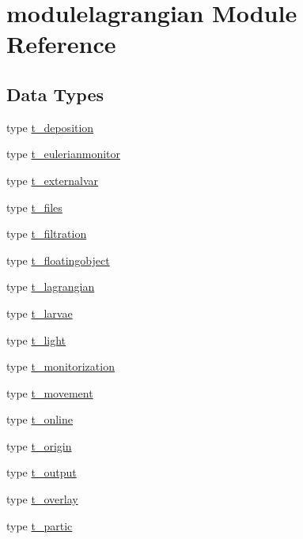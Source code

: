 \hypertarget{namespacemodulelagrangian}{}\section{modulelagrangian Module Reference}
\label{namespacemodulelagrangian}
\subsection*{Data Types}
\begin{DoxyCompactItemize}
\item 
type \mbox{\hyperlink{structmodulelagrangian_1_1t__deposition}{t\+\_\+deposition}}
\item 
type \mbox{\hyperlink{structmodulelagrangian_1_1t__eulerianmonitor}{t\+\_\+eulerianmonitor}}
\item 
type \mbox{\hyperlink{structmodulelagrangian_1_1t__externalvar}{t\+\_\+externalvar}}
\item 
type \mbox{\hyperlink{structmodulelagrangian_1_1t__files}{t\+\_\+files}}
\item 
type \mbox{\hyperlink{structmodulelagrangian_1_1t__filtration}{t\+\_\+filtration}}
\item 
type \mbox{\hyperlink{structmodulelagrangian_1_1t__floatingobject}{t\+\_\+floatingobject}}
\item 
type \mbox{\hyperlink{structmodulelagrangian_1_1t__lagrangian}{t\+\_\+lagrangian}}
\item 
type \mbox{\hyperlink{structmodulelagrangian_1_1t__larvae}{t\+\_\+larvae}}
\item 
type \mbox{\hyperlink{structmodulelagrangian_1_1t__light}{t\+\_\+light}}
\item 
type \mbox{\hyperlink{structmodulelagrangian_1_1t__monitorization}{t\+\_\+monitorization}}
\item 
type \mbox{\hyperlink{structmodulelagrangian_1_1t__movement}{t\+\_\+movement}}
\item 
type \mbox{\hyperlink{structmodulelagrangian_1_1t__online}{t\+\_\+online}}
\item 
type \mbox{\hyperlink{structmodulelagrangian_1_1t__origin}{t\+\_\+origin}}
\item 
type \mbox{\hyperlink{structmodulelagrangian_1_1t__output}{t\+\_\+output}}
\item 
type \mbox{\hyperlink{structmodulelagrangian_1_1t__overlay}{t\+\_\+overlay}}
\item 
type \mbox{\hyperlink{structmodulelagrangian_1_1t__partic}{t\+\_\+partic}}

\end{DoxyCompactItemize}
